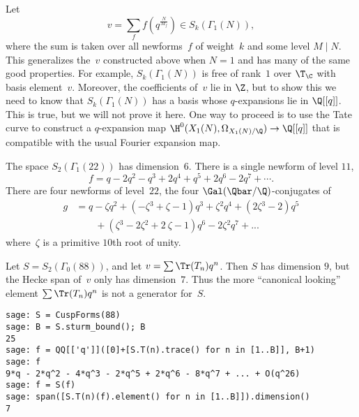 \documentclass{report}
\begin{document}
Let
\[
  v=\sum_{f} f(q^{\frac{N}{M_f}})\in S_k(\Gamma_1(N)),
\]
where the sum is taken over all newforms~$f$ of weight~$k$ and
some level $M\mid{}N$. This generalizes the~$v$ constructed above
when $N=1$ and has many of the same good properties. For example,
$S_k(\Gamma_1(N))$ is free of rank~$1$ over $\T_{\C}$ with basis
element~$v$.   Moreover, the coefficients of~$v$ lie in $\Z$, but
to show this we need to know that $S_k(\Gamma_1(N))$ has a basis
whose $q$-expansions lie in $\Q[[q]]$.   This is true, but we will
not prove it here.  One way to proceed is to use the Tate curve to
construct a
$q$-expansion map $\H^0(X_1(N),\Omega_{X_1(N)/\Q}) \to \Q[[q]]$
that is compatible with the usual Fourier expansion map.

\begin{example}\label{ex:gamma1_22}
The space $S_2(\Gamma_1(22))$ has dimension~$6$.  There is a
single newform of level $11$,
\[
   f = q - 2q^2 - q^3 + 2q^4 + q^5 + 2q^6 - 2q^7 + \cdots.
\]
There are four newforms of level~$22$, the four
$\Gal(\Qbar/\Q)$-conjugates of%
\begin{align*}
 g &=
q - \zeta{}q^2 + (-\zeta{}^3 + \zeta{} - 1)q^3 + \zeta{}^2q^4 +
(2\zeta{}^3 - 2)q^5 \\
 & \qquad+ (\zeta{}^3 - 2\zeta{}^2 + 2\ \zeta{} -
1)q^6 - 2\zeta{}^2q^7 + ...
\end{align*}
where~$\zeta$ is a primitive $10$th root of unity.
\end{example}

\begin{warning}
Let $S = S_2(\Gamma_0(88))$, and let $v = \sum \Tr(T_n)q^n$.  Then
$S$ has dimension $9$, but the Hecke span of~$v$ only has
dimension~$7$.  Thus the more ``canonical looking'' element $\sum
\Tr(T_n)q^n$ is not a generator for~$S$.
\begin{lstlisting}
sage: S = CuspForms(88)
sage: B = S.sturm_bound(); B
25
sage: f = QQ[['q']]([0]+[S.T(n).trace() for n in [1..B]], B+1)
sage: f
9*q - 2*q^2 - 4*q^3 - 2*q^5 + 2*q^6 - 8*q^7 + ... + O(q^26)
sage: f = S(f)
sage: span([S.T(n)(f).element() for n in [1..B]]).dimension()
7
\end{lstlisting}

\end{warning}
\end{document}

